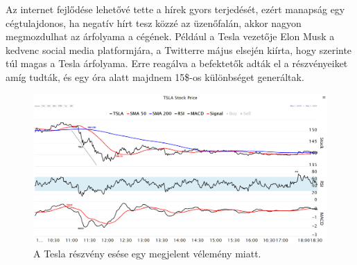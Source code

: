 Az internet fejlődése lehetővé tette a hírek gyors terjedését, ezért manapság egy cégtulajdonos, ha negatív hírt tesz közzé az üzenőfalán, akkor nagyon megmozdulhat az árfolyama a cégének. Például a Tesla vezetője Elon Musk a kedvenc social media platformjára, a Twitterre május elsején kiírta, hogy szerinte túl magas a Tesla árfolyama. Erre reagálva a befektetők adták el a részvényeiket amíg tudták, és egy óra alatt majdnem 15\$-os különbséget generáltak.
\begin{figure}[ht]
\centering
\includegraphics[width=\textwidth]{images/TSLA_news.png}
\caption{A Tesla részvény esése egy megjelent vélemény miatt.}
\label{fig:TSLA_news}
\end{figure}





